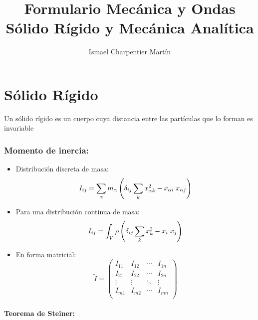 \documentclass[14pt]{extarticle}
\title{
	\Huge{Formulario Mecánica y Ondas} \\
	\medskip
	\large Sólido Rígido y Mecánica Analítica}
\author{Ismael Charpentier Martín}
\begin{document}
\maketitle
\clearpage

\tableofcontents
\clearpage

\part{Sólido Rígido}

	Un sólido rígido es un cuerpo cuya distancia entre las partículas que lo forman es invariable

	\section{Momento de inercia:}

		\begin{itemize}

			\item{
			Distribución discreta de masa:
			\begin{equation}
				I_{ij} = \sum_\alpha m_\alpha \left( \delta_{ij} \sum_k x^2_{\alpha k} - x_{\alpha i}\hspace*{1mm} x_{\alpha j} \right)
			\end{equation}
			}

			\item{
			Para una distribución continua de masa:
			\begin{equation}
				I_{ij} = \int_V \rho \left( \delta_{ij} \sum_k x^2_{k} - x_{i}\hspace*{1mm} x_{j} \right)
			\end{equation}
			}

			\item{
			En forma matricial:
			\begin{equation}
				\tilde{I} = 
				\begin{pmatrix}
					I_{11} & I_{12} & \cdots & I_{1n}\\
					I_{21} & I_{22} & \cdots & I_{2n}\\
					\vdots & \vdots & \ddots & \vdots \\
					I_{m1} & I_{m2} & \cdots & I_{mn}\\
				\end{pmatrix}
			\end{equation}
			}
		\end{itemize}

		\subsection{Teorema de Steiner:}
\end{document}
